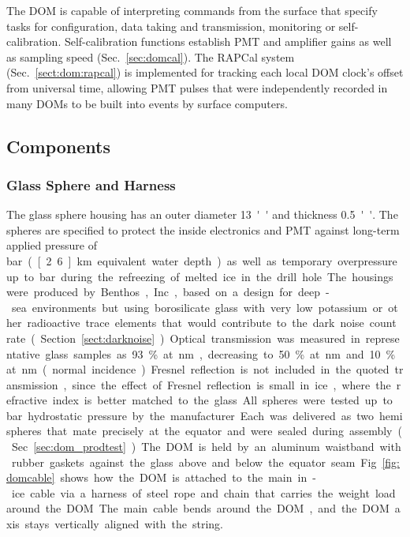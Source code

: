 The DOM is capable of interpreting commands from the surface that specify
tasks for configuration, data taking and transmission, monitoring or
self-calibration.  Self-calibration functions establish PMT and amplifier
gains as well as sampling speed (Sec.~\ref{sec:domcal}).  The RAPCal
system (Sec.~\ref{sect:dom:rapcal}) is implemented for tracking each
local DOM clock's offset from universal time, allowing PMT pulses that were
independently recorded in many DOMs to be built into events by surface
computers.

\subsection{\label{sec:dom_components}Components}

\subsubsection{\label{sec:sphere}Glass Sphere and Harness}

The glass sphere housing has an outer diameter \SI{13}{''} and thickness \SI{0.5}{''}.
The spheres are specified to protect the inside electronics and PMT against long-term applied pressure of 
\unit[250]bar (\unit[2.6]km equivalent water depth)
as well as temporary overpressure up to \unit[690]bar during the refreezing of melted ice in the drill hole.
The housings were produced by Benthos, Inc., based on a design for deep-sea
environments but using borosilicate glass
with very low potassium or other radioactive trace elements that would contribute to the dark noise
count rate (Section~\ref{sect:darknoise}).  
Optical transmission was measured in representative glass samples as 93\% at \unit[400]nm,
decreasing to 50\% at \unit[340]nm and 10\% at \unit[315]nm (normal
incidence). Fresnel reflection is not included in the quoted
transmission, since the effect of Fresnel reflection is small in ice,
where the refractive index is better matched to the glass.


All spheres were tested up to \unit[690]bar hydrostatic pressure by the manufacturer.
Each was delivered as two hemispheres that mate precisely at the equator
and were sealed during assembly (Sec.~\ref{sec:dom_prodtest}).  The DOM
is held by an aluminum waistband with rubber gaskets against 
the glass above and below the equator seam. 
Fig.~\ref{fig:domcable} shows how the DOM is attached to the main in-ice cable via a harness
of steel rope and chain that carries the weight load around the DOM.
The main cable bends around the DOM, and the DOM axis stays vertically aligned with the string.

